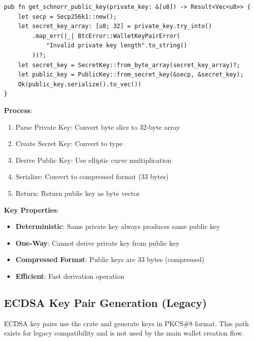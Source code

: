 \begin{listing}[htbp]
\caption{Schnorr public key derivation ()}
\label{lst:ch08-schnorr-pubkey}
\begin{verbatim}
pub fn get_schnorr_public_key(private_key: &[u8]) -> Result<Vec<u8>> {
    let secp = Secp256k1::new();
    let secret_key_array: [u8; 32] = private_key.try_into()
        .map_err(|_| BtcError::WalletKeyPairError(
            "Invalid private key length".to_string()
        ))?;
    let secret_key = SecretKey::from_byte_array(secret_key_array)?;
    let public_key = PublicKey::from_secret_key(&secp, &secret_key);
    Ok(public_key.serialize().to_vec())
}
\end{verbatim}
\end{listing}

\textbf{Process}:
\begin{enumerate}
  \item Parse Private Key: Convert byte slice to 32-byte array
  \item Create Secret Key: Convert to  type
  \item Derive Public Key: Use elliptic curve multiplication
  \item Serialize: Convert to compressed format (33 bytes)
  \item Return: Return public key as byte vector
\end{enumerate}

\textbf{Key Properties}:
\begin{itemize}
  \item \textbf{Deterministic}: Same private key always produces same public key
  \item \textbf{One-Way}: Cannot derive private key from public key
  \item \textbf{Compressed Format}: Public keys are 33 bytes (compressed)
  \item \textbf{Efficient}: Fast derivation operation
\end{itemize}

\subsection{ECDSA Key Pair Generation (Legacy)}
\label{sec:ch08-ecdsa-keypair}

ECDSA key pairs use the  crate and generate keys in PKCS\#8 format. This path exists for legacy compatibility and is not used by the main wallet creation flow.

